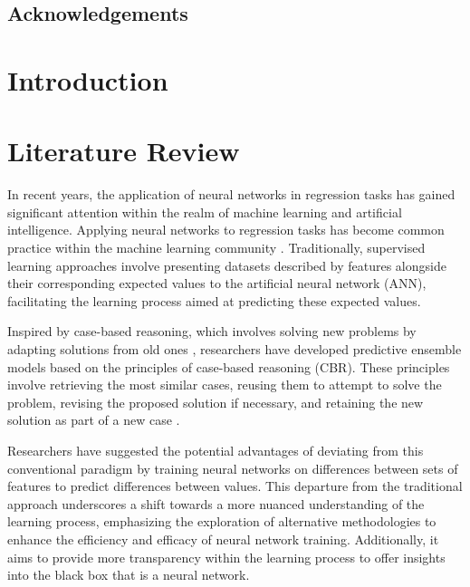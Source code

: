 \documentclass[a4paper, 12pt]{report}
\begin{document}
\section{Acknowledgements}


\tableofcontents

\listoffigures

\listoftables

\chapter{Introduction}
\label{ch:introduction}


\chapter{Literature Review}
\label{ch:Literature Review}
In recent years, the application of neural networks in regression tasks has gained significant attention within the realm of machine learning and artificial intelligence.
Applying neural networks to regression tasks has become common practice within the machine learning community \cite{neuralNetForRegression}.
Traditionally, supervised learning approaches involve presenting datasets described by features alongside their corresponding expected values to the artificial neural network (ANN),
facilitating the learning process aimed at predicting these expected values.

Inspired by case-based reasoning, which involves solving new problems by adapting solutions from old ones \cite{riesbeck2013inside},
researchers have developed predictive ensemble models based on the principles of case-based reasoning (CBR).
These principles involve retrieving the most similar cases, reusing them to attempt to solve the problem, revising the proposed solution if necessary,
and retaining the new solution as part of a new case \cite{watsonCaseBasedReasoningReview}.

Researchers have suggested the potential advantages of deviating from this conventional paradigm by training neural networks on differences between sets of features to predict
differences between values. This departure from the traditional approach underscores a shift towards a more nuanced understanding of the learning process,
emphasizing the exploration of alternative methodologies to enhance the efficiency and efficacy of neural network training.
Additionally, it aims to provide more transparency within the learning process to offer insights into the black box that is a neural network.
\end{document}
